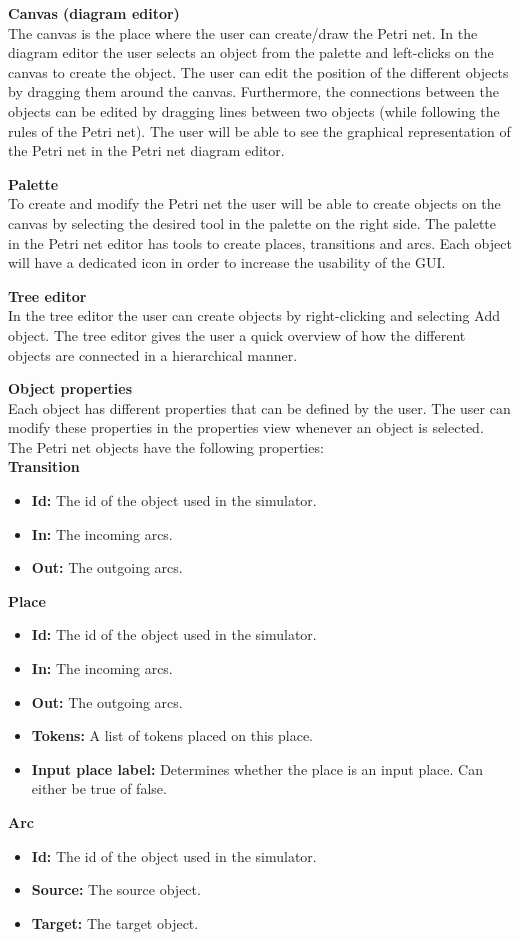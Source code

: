 \textbf{Canvas (diagram editor)} \\
The canvas is the place where the user can create/draw the Petri net. In the diagram editor the user selects an object from the palette and left-clicks on the canvas to create the object. The user can edit the position of the different objects by dragging them around the canvas. Furthermore, the connections between the objects can be edited by dragging lines between two objects (while following the rules of the Petri net). The user will be able to see the graphical representation of the Petri net in the Petri net diagram editor. 

\textbf{Palette} \\
To create and modify the Petri net the user will be able to create objects on the canvas by selecting the desired tool in the palette on the right side. The palette in the Petri net editor has tools to create places, transitions and arcs. Each object will have a dedicated icon in order to increase the usability of the GUI.

\textbf{Tree editor} \\
In the tree editor the user can create objects by right-clicking and selecting Add object. The tree editor gives the user a quick overview of how the different objects are connected in a hierarchical manner.

\textbf{Object properties} \\
Each object has different properties that can be defined by the user. The user can modify these properties in the properties view whenever an object is selected. The Petri net objects have the following properties: \\
\textbf{Transition}
\begin{itemize}
\item{\textbf{Id:} The id of the object used in the simulator.}
\item{\textbf{In:} The incoming arcs.}
\item{\textbf{Out:} The outgoing arcs.}
\end{itemize}
\textbf{Place}%
\begin{itemize}
\item{\textbf{Id:} The id of the object used in the simulator.}
\item{\textbf{In:} The incoming arcs.}
\item{\textbf{Out:} The outgoing arcs.}
\item{\textbf{Tokens:} A list of tokens placed on this place.}
\item{\textbf{Input place label:} Determines whether the place is an input place. Can either be true of false.}
\end{itemize}
\textbf{Arc}%
\begin{itemize}
\item{\textbf{Id:} The id of the object used in the simulator.}
\item{\textbf{Source:} The source object.}
\item{\textbf{Target:} The target object.}
\end{itemize}

